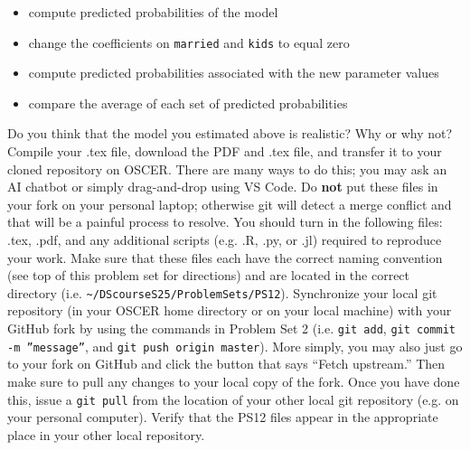 \documentclass[12pt,english]{exam}
\begin{document}
\begin{questions}
\begin{itemize}
    \item compute predicted probabilities of the model
    \item change the coefficients on \texttt{married} and \texttt{kids} to equal zero
    \item compute predicted probabilities associated with the new parameter values
    \item compare the average of each set of predicted probabilities
\end{itemize}
Do you think that the model you estimated above is realistic? Why or why not?
\question Compile your .tex file, download the PDF and .tex file, and transfer it to your cloned repository on OSCER. There are many ways to do this;  you may ask an AI chatbot or simply drag-and-drop using VS Code. Do \textbf{not} put these files in your fork on your personal laptop; otherwise git will detect a merge conflict and that will be a painful process to resolve.
\question You should turn in the following files: .tex, .pdf, and any additional scripts (e.g. .R, .py, or .jl) required to reproduce your work.  Make sure that these files each have the correct naming convention (see top of this problem set for directions) and are located in the correct directory (i.e. \texttt{\textasciitilde/DScourseS25/ProblemSets/PS12}).
\question Synchronize your local git repository (in your OSCER home directory or on your local machine) with your GitHub fork by using the commands in Problem Set 2 (i.e. \texttt{git add}, \texttt{git commit -m ''message''}, and \texttt{git push origin master}). More simply, you may also just go to your fork on GitHub and click the button that says ``Fetch upstream.'' Then make sure to pull any changes to your local copy of the fork. Once you have done this, issue a \texttt{git pull} from the location of your other local git repository (e.g. on your personal computer). Verify that the PS12 files appear in the appropriate place in your other local repository.
\end{questions}
\end{document}
